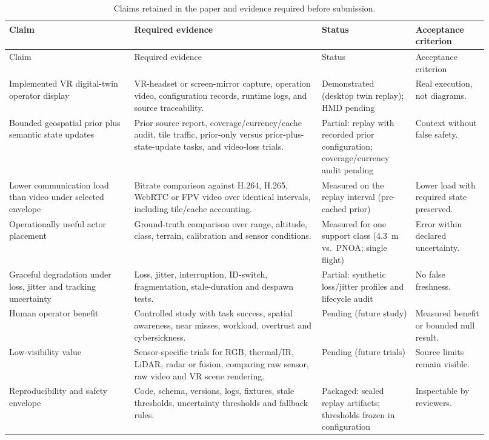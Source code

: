 \documentclass[fleqn]{VRIH2025}
\begin{document}
\begingroup
\scriptsize
\setlength{\tabcolsep}{2pt}
\begin{longtable}{@{}L{0.24\linewidth}L{0.36\linewidth}L{0.18\linewidth}L{0.14\linewidth}@{}}
\caption{Claims retained in the paper and evidence required before submission.}
\label{tab:claim-evidence}\\
\toprule
Claim & Required evidence & Status & Acceptance criterion \\
\midrule
\endfirsthead
\toprule
Claim & Required evidence & Status & Acceptance criterion \\
\midrule
\endhead
Implemented VR digital-twin operator display & VR-headset or screen-mirror capture, operation video, configuration records, runtime logs, and source traceability. & Demonstrated (desktop twin replay); HMD pending & Real execution, not diagrams. \\
Bounded geospatial prior plus semantic state updates & Prior source report, coverage/currency/cache audit, tile traffic, prior-only versus prior-plus-state-update tasks, and video-loss trials. & Partial: replay with recorded prior configuration; coverage/currency audit pending & Context without false safety. \\
Lower communication load than video under selected envelope & Bitrate comparison against H.264, H.265, WebRTC or FPV video over identical intervals, including tile/cache accounting. & Measured on the replay interval (pre-cached prior) & Lower load with required state preserved. \\
Operationally useful actor placement & Ground-truth comparison over range, altitude, class, terrain, calibration and sensor conditions. & Measured for one support class (4.3~m vs.\ PNOA; single flight) & Error within declared uncertainty. \\
Graceful degradation under loss, jitter and tracking uncertainty & Loss, jitter, interruption, ID-switch, fragmentation, stale-duration and despawn tests. & Partial: synthetic loss/jitter profiles and lifecycle audit & No false freshness. \\
Human operator benefit & Controlled study with task success, spatial awareness, near misses, workload, overtrust and cybersickness. & Pending (future study) & Measured benefit or bounded null result. \\
Low-visibility value & Sensor-specific trials for RGB, thermal/IR, LiDAR, radar or fusion, comparing raw sensor, raw video and VR scene rendering. & Pending (future trials) & Source limits remain visible. \\
Reproducibility and safety envelope & Code, schema, versions, logs, fixtures, stale thresholds, uncertainty thresholds and fallback rules. & Packaged: sealed replay artifacts; thresholds frozen in configuration & Inspectable by reviewers. \\
\bottomrule
\end{longtable}
\endgroup
\end{document}
